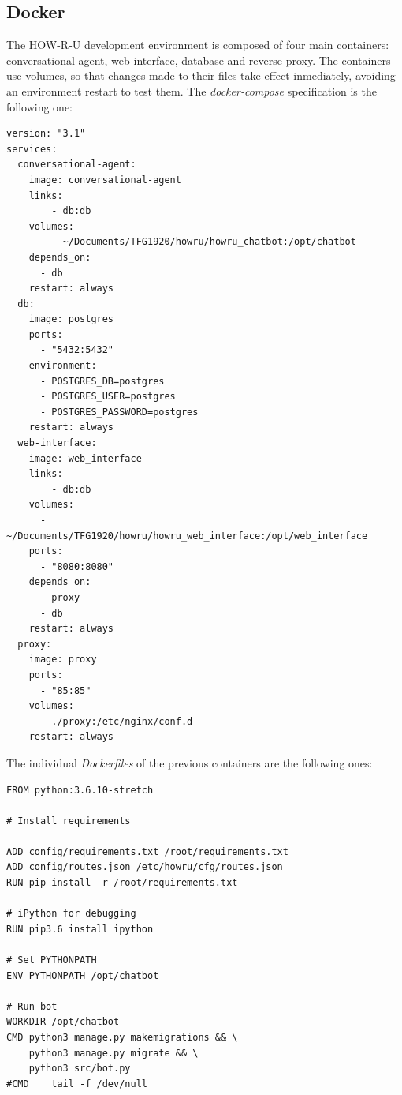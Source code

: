 \documentclass[12pt,english]{article}
\begin{document}
\subsection{Docker}
\label{sec:docker}

The HOW-R-U development environment is composed of four main containers: conversational agent, web interface, database and reverse proxy. The containers use volumes, so that changes made to their files take effect inmediately, avoiding an environment restart to test them. The \emph{docker-compose} specification is the following one:

\begin{lstlisting}[language=docker-compose-2, caption={HOW-R-U docker-compose file}, captionpos=b]
version: "3.1"
services:
  conversational-agent:
    image: conversational-agent
    links:
        - db:db
    volumes:
        - ~/Documents/TFG1920/howru/howru_chatbot:/opt/chatbot
    depends_on:
      - db
    restart: always
  db:
    image: postgres
    ports:
      - "5432:5432"
    environment:
      - POSTGRES_DB=postgres
      - POSTGRES_USER=postgres
      - POSTGRES_PASSWORD=postgres
    restart: always
  web-interface:
    image: web_interface
    links:
        - db:db
    volumes:
      - ~/Documents/TFG1920/howru/howru_web_interface:/opt/web_interface
    ports:
      - "8080:8080"
    depends_on:
      - proxy
      - db
    restart: always
  proxy:
    image: proxy
    ports:
      - "85:85"
    volumes:
      - ./proxy:/etc/nginx/conf.d
    restart: always
\end{lstlisting}

The individual \emph{Dockerfiles} of the previous containers are the following ones:

\begin{lstlisting}[language=docker, caption={HOW-R-U conversational agent Dockerfile}, captionpos=b]
FROM python:3.6.10-stretch

# Install requirements

ADD config/requirements.txt /root/requirements.txt
ADD config/routes.json /etc/howru/cfg/routes.json
RUN pip install -r /root/requirements.txt

# iPython for debugging
RUN pip3.6 install ipython

# Set PYTHONPATH
ENV PYTHONPATH /opt/chatbot

# Run bot
WORKDIR /opt/chatbot
CMD python3 manage.py makemigrations && \
    python3 manage.py migrate && \
    python3 src/bot.py
#CMD    tail -f /dev/null
\end{lstlisting}
\end{document}

